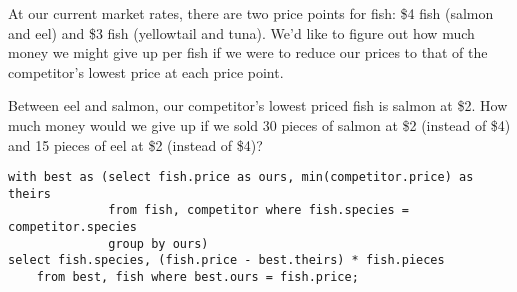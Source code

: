 \begin{blocksection}
\question At our current market rates, there are two price points for fish: \$4 fish (salmon and eel) and \$3 fish (yellowtail and tuna). We'd like to figure out how much money we might give up per fish if we were to reduce our prices to that of the competitor's lowest price at each price point.

Between eel and salmon, our competitor's lowest priced fish is salmon at \$2. How much money would we give up if we sold 30 pieces of salmon at \$2 (instead of \$4) and 15 pieces of eel at \$2 (instead of \$4)?

\begin{solution}[1.5in]
\begin{lstlisting}
with best as (select fish.price as ours, min(competitor.price) as theirs
              from fish, competitor where fish.species = competitor.species
              group by ours)
select fish.species, (fish.price - best.theirs) * fish.pieces
    from best, fish where best.ours = fish.price;
\end{lstlisting}
\end{solution}
\end{blocksection}
